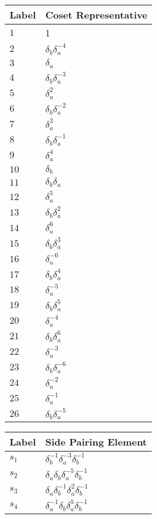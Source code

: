 \documentclass{article}
\begin{document}

\begin{center}
\begin{tabular}{ll}
\toprule
Label & Coset Representative\\
\midrule
$1$ & 1 \\
$2$ & $\delta_b^{}\delta_a^{-4}$ \\
$3$ & $\delta_a^{}$ \\
$4$ & $\delta_b^{}\delta_a^{-3}$ \\
$5$ & $\delta_a^{2}$ \\
$6$ & $\delta_b^{}\delta_a^{-2}$ \\
$7$ & $\delta_a^{3}$ \\
$8$ & $\delta_b^{}\delta_a^{-1}$ \\
$9$ & $\delta_a^{4}$ \\
$10$ & $\delta_b^{}$ \\
$11$ & $\delta_b^{}\delta_a^{}$ \\
$12$ & $\delta_a^{5}$ \\
$13$ & $\delta_b^{}\delta_a^{2}$ \\
$14$ & $\delta_a^{6}$ \\
$15$ & $\delta_b^{}\delta_a^{3}$ \\
$16$ & $\delta_a^{-6}$ \\
$17$ & $\delta_b^{}\delta_a^{4}$ \\
$18$ & $\delta_a^{-5}$ \\
$19$ & $\delta_b^{}\delta_a^{5}$ \\
$20$ & $\delta_a^{-4}$ \\
$21$ & $\delta_b^{}\delta_a^{6}$ \\
$22$ & $\delta_a^{-3}$ \\
$23$ & $\delta_b^{}\delta_a^{-6}$ \\
$24$ & $\delta_a^{-2}$ \\
$25$ & $\delta_a^{-1}$ \\
$26$ & $\delta_b^{}\delta_a^{-5}$ \\
\bottomrule
\end{tabular}
\hfill
\begin{tabular}{ll}
\toprule
Label & Side Pairing Element\\
\midrule
$s_{1}$ & $\delta_b^{-1}\delta_a^{-3}\delta_b^{-1}$ \\
$s_{2}$ & $\delta_a^{}\delta_b^{}\delta_a^{-5}\delta_b^{-1}$ \\
$s_{3}$ & $\delta_a^{}\delta_b^{-1}\delta_a^{2}\delta_b^{-1}$ \\
$s_{4}$ & $\delta_a^{-1}\delta_b^{}\delta_a^{5}\delta_b^{-1}$ \\

\end{tabular}
\end{center}
\end{document}

